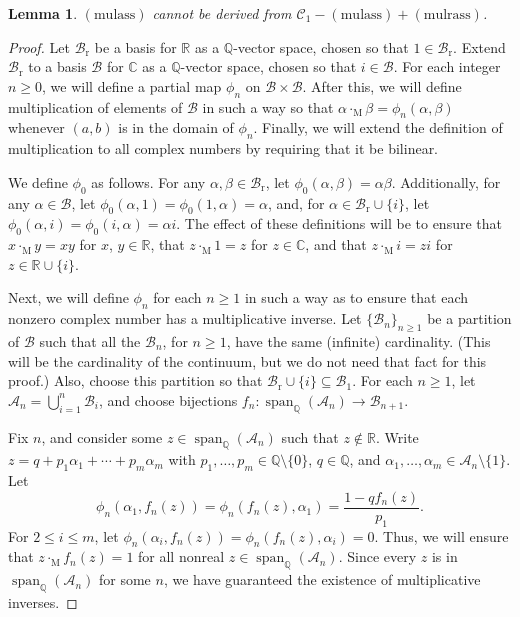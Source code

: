 \documentclass{article}
\newcommand\bC{\mathbb{C}}
\newcommand\bR{\mathbb{R}}
\newcommand\bQ{\mathbb{Q}}
\newcommand\cA{\mathcal{A}}
\newcommand\cB{\mathcal{B}}
\newcommand\cC{\mathcal{C}}
\newcommand\rM{\mathrm{M}}
\newcommand\rr{\mathrm{r}}
\DeclareMathOperator{\linspan}{span}
\newtheorem{lemma}{Lemma}[section]
\begin{document}
\begin{lemma}
$\mathrm{(mulass)}$ cannot be derived from $\cC_1 - \mathrm{(mulass)} + \mathrm{(mulrass)}$.
\end{lemma}
\begin{proof}
Let $\cB_\rr$ be a basis for $\bR$ as a $\bQ$-vector space, chosen so that $1 \in \cB_\rr$. Extend $\cB_\rr$ to a basis $\cB$ for $\bC$ as a $\bQ$-vector space, chosen so that $i \in \cB$. For each integer $n \ge 0$, we will define a partial map $\phi_n$ on $\cB \times \cB$. After this, we will define multiplication of elements of $\cB$ in such a way so that $\alpha \cdot_\rM \beta = \phi_n(\alpha,\beta)$ whenever $(a,b)$ is in the domain of $\phi_n$. Finally, we will extend the definition of multiplication to all complex numbers by requiring that it be bilinear.

We define $\phi_0$ as follows. For any $\alpha, \beta \in \cB_\rr$, let $\phi_0(\alpha,\beta) = \alpha\beta$. Additionally, for any $\alpha \in \cB$, let $\phi_0(\alpha, 1) = \phi_0(1, \alpha) = \alpha$, and, for $\alpha \in \cB_\rr \cup \{i\}$, let $\phi_0(\alpha, i) = \phi_0(i, \alpha) = \alpha i$. The effect of these definitions will be to ensure that $x \cdot_\rM y = xy$ for $x$, $y \in \bR$, that $z \cdot_\rM 1 = z$ for $z \in \bC$, and that $z \cdot_\rM i = zi$ for $z \in \bR \cup \{i\}$.

Next, we will define $\phi_n$ for each $n \ge 1$ in such a way as to ensure that each nonzero complex number has a multiplicative inverse. Let $\{\cB_n\}_{n \ge 1}$ be a partition of $\cB$ such that all the $\cB_n$, for $n \ge 1$, have the same (infinite) cardinality. (This will be the cardinality of the continuum, but we do not need that fact for this proof.) Also, choose this partition so that $\cB_\rr \cup \{i\} \subseteq \cB_1$. For each $n \ge 1$, let $\cA_n = \bigcup_{i=1}^n \cB_i$, and choose bijections $f_n : \linspan_\bQ(\cA_n) \longrightarrow \cB_{n+1}$.

Fix $n$, and consider some $z \in \linspan_\bQ(\cA_n)$ such that $z \notin \bR$. Write $z = q + p_1\alpha_1 + \cdots + p_m\alpha_m$ with $p_1,\dotsc,p_m \in \bQ \setminus \{0\}$, $q \in \bQ$, and $\alpha_1, \dotsc, \alpha_m \in \cA_n \setminus \{1\}$. Let
\[\phi_n(\alpha_1, f_n(z)) = \phi_n(f_n(z), \alpha_1) = \frac{1 - qf_n(z)}{p_1}.\]
For $2 \le i \le m$, let $\phi_n(\alpha_i, f_n(z)) = \phi_n(f_n(z), \alpha_i) = 0$. Thus, we will ensure that $z \cdot_\rM f_n(z) = 1$ for all nonreal $z \in \linspan_\bQ(\cA_n)$. Since every $z$ is in $\linspan_\bQ(\cA_n)$ for some $n$, we have guaranteed the existence of multiplicative inverses.


\end{proof}
\end{document}
